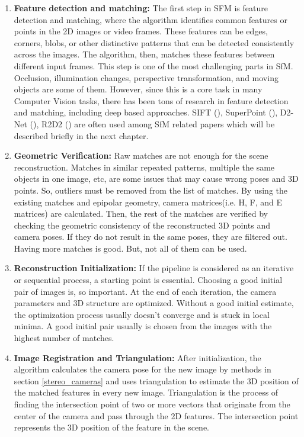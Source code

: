 \documentclass[11pt]{article}
\begin{document}
    \begin{enumerate}
        \item \textbf{Feature detection and matching:} The first step in SFM is feature detection and matching, where
        the algorithm identifies common features or points in the 2D images or video frames. These features
        can be edges, corners, blobs, or other distinctive patterns that can be detected consistently across
        the images. The algorithm, then, matches these features between different input frames. This step is one
        of the most challenging parts in SfM. Occlusion, illumination changes, perspective transformation, and moving objects
        are some of them. However, since this is a core task in many Computer Vision tasks, there has been
        tons of research in feature detection and matching, including deep based approaches. SIFT (\cite{lowe1999object}), SuperPoint (\cite{detone2018superpoint}),
        D2-Net (\cite{dusmanu2019d2net}), R2D2 (\cite{revaud2019r2d2}) are often used among SfM related papers which
        will be described briefly in the next chapter.

        \item \textbf{Geometric Verification:} Raw matches are not enough for the scene reconstruction.
        Matches in similar repeated patterns, multiple the same objects in one image, etc, are some issues that may cause wrong
        poses and 3D points. So, outliers must be removed from the list of matches. By using the existing matches and
        epipolar geometry, camera matrices(i.e. H, F, and E matrices) are calculated.
        Then, the rest of the matches are verified by checking the geometric consistency of the reconstructed 3D points and
        camera poses. If they do not result in the same poses, they are filtered out. Having more matches is good.
        But, not all of them can be used.

        \item \textbf{Reconstruction Initialization:} If the pipeline is considered as an iterative or sequential process,
        a starting point is essential. Choosing a good initial pair of images is, so important. At the end of
        each iteration, the camera parameters and 3D structure are optimized. Without a good initial estimate,
        the optimization process usually doesn't converge and is stuck in local minima. A good initial pair usually is
        chosen from the images with the highest number of matches.

        \item \textbf{Image Registration and Triangulation:} After initialization, the algorithm calculates the
        camera pose for the new image by methods in section \ref{stereo_cameras} and uses triangulation to estimate
        the 3D position of the matched features in every new image. Triangulation is the process of finding the intersection point
        of two or more vectors that originate from the center of the camera and pass through the 2D features. The intersection
        point represents the 3D position of the feature in the scene.


\end{enumerate}
\end{document}
